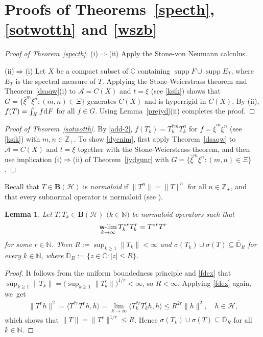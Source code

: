 \documentclass[reqno]{amsproc}
\DeclareMathOperator{\supp}{supp}
\numberwithin{equation}{section}
\newtheorem{lemma}[theorem]{Lemma}
\theoremstyle{remark}
\newcommand*{\ascr}{\mathscr{A}}
\newcommand*{\hh}{\mathcal{H}}
\newcommand*{\is}[2]{\langle#1,#2\rangle}
\newcommand*{\natu}{\mathbb{N}}
\newcommand*{\comp}{\mathbb{C}}
\newcommand*{\bou}{\boldsymbol{B}}
\newcommand*{\cbb}{\comp}
\newcommand*{\D}{\mathrm{d\hspace{.1ex}}}
\theoremstyle{definition}
\newcommand*{\Le}{\leqslant}
\newcommand*{\Ge}{\geqslant}
\newcommand*{\ogr}{\boldsymbol{B}}
\newcommand*{\zbb}{\mathbb{Z}}
\def\wwlim{\qopname\relax m{{\sf{w}\textrm-}lim}}
\begin{document}
   \section{\label{Sec.7n}Proofs of Theorems~\ref{specth},
\ref{sotwotth} and \ref{wszb}}
   \begin{proof}[Proof of Theorem~\ref{specth}]
(i)$\Rightarrow$(ii) Apply the Stone-von Neumann
calculus.

(ii)$\Rightarrow$(i) Let $X$ be a compact subset of
$\cbb$ containing $\supp{F} \cup \supp{E_{T}}$, where
$E_{T}$ is the spectral measure of $T$. Applying the
Stone-Weierstrass theorem and Theorem~\ref{dsaqw}(i)
to $\ascr=C(X)$ and $t=\xi$ (see \eqref{ksik}) shows
that $G=\{\bar\xi^{m}\xi^n \colon (m,n)\in \varXi\}$
generates $C(X)$ and is hyperrigid in $C(X)$. By (ii),
$f(T)=\int_{X} f \D F$ for all $f\in G$. Using
Lemma~\ref{prejyd}(ii) completes the proof.
   \end{proof}
   \begin{proof}[Proof of Theorem~\ref{sotwotth}]
By \eqref{add-2}, $f(T_k)=T_k^{*m}T_k^n$ for
$f=\bar\xi^{m}\xi^{n}$ (see \eqref{ksik}) with $m,n
\in \zbb_+$. To show \eqref{dycnim}, first apply
Theorem~\ref{dsaqw} to $\ascr=C(X)$ and $t=\xi$
together with the Stone-Weierstrass theorem, and then
use implication (i)$\Rightarrow$(ii) of
Theorem~\ref{jydgunr} with
$G=\{\bar{\xi}^{m}\xi^{n}\colon (m,n)\in \varXi\}$.
   \end{proof}
Recall that $T\in \ogr(\hh)$ is {\em normaloid} if
$\|T^n\|=\|T\|^n$ for all $n\in \zbb_+$, and that
every subnormal operator is normaloid (see
\cite[Theorem~1 in \S 2.6.2]{Fur01}).
   \begin{lemma} \label{wydnu}
Let $T, T_k\in \bou(\hh)$ $($$k\in \natu$$)$ be
normaloid operators such that
   \begin{align} \label{fdex}
\wwlim_{k\to\infty} T_k^{*r}T_k^r = T^{*r}T^r
   \end{align}
for some $r\in \natu$. Then $R:=\sup_{k\Ge 1} \|T_k\|<
\infty$ and $\sigma(T_k) \cup \sigma(T) \subseteq
\overline{\mathbb{D}}_R$ for every $k\in \natu$, where
$\overline{\mathbb{D}}_R:=\{z\in \cbb\colon |z|\Le
R\}$.
   \end{lemma}
   \begin{proof}
It follows from the uniform boundedness
principle and \eqref{fdex} that $\sup_{k\Ge
1} \|T_k\| = \big(\sup_{k\Ge 1}
\|T_k^r\|\big)^{1/r} < \infty$, so
$R<\infty$. Applying \eqref{fdex} again,
we~get
   \begin{align*}
\|T^rh\|^2 = \is{T^{*r}T^rh}{h} = \lim_{k\to\infty}
\is{T_k^{*r}T_k^rh}{h} \Le R^{2r} \|h\|^2, \quad h\in
\hh,
   \end{align*}
which shows that $\|T\|= \|T^r\|^{1/r} \Le
R$. Hence $\sigma(T_k) \cup \sigma(T)
\subseteq \overline{\mathbb{D}}_R$ for all
$k\in \natu$.
   \end{proof}
\end{document}
